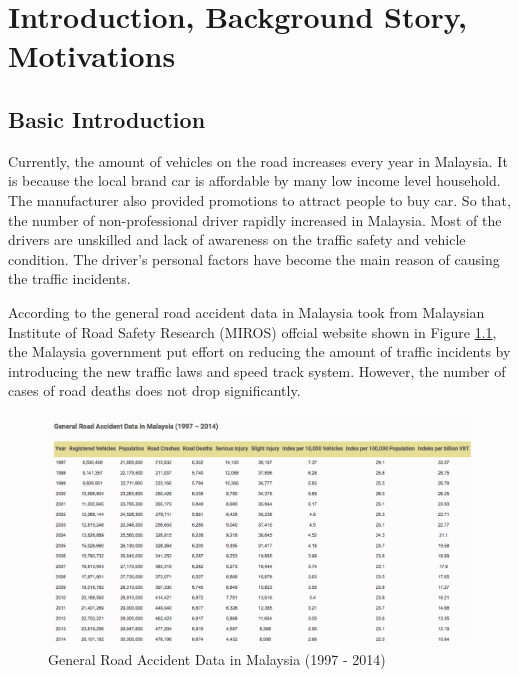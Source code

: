 \chapter{Introduction, Background Story, Motivations}
\section{Basic Introduction}
Currently, the amount of vehicles on the road increases every year in Malaysia.  
It is because the local brand car is affordable by many low income level household. The manufacturer also provided promotions to attract people to buy car. So that, the number of non-professional driver rapidly increased in Malaysia. Most of the drivers are unskilled and lack of awareness on the traffic safety and vehicle condition. The driver's personal factors have become the main reason of causing the traffic incidents.

According to the general road accident data in Malaysia took from Malaysian Institute of Road Safety Research (MIROS) offcial website shown in Figure \ref{fig:accident}, the Malaysia government put effort on reducing the amount of traffic incidents by introducing the new traffic laws and speed track system. However, the number of cases of road deaths does not drop significantly. 

\begin{figure}[hbt!]\centering
\includegraphics[width=.75\textwidth]{image/accident}
\caption{General Road Accident Data in Malaysia (1997 - 2014)}
\label{fig:accident}
\end{figure}

